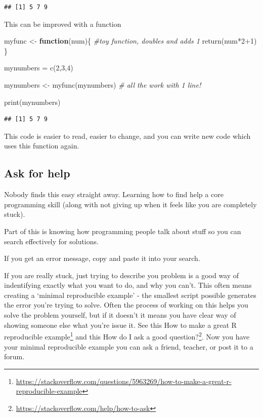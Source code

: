 \documentclass[
  12pt,
  a5paper,
]{book}
\newenvironment{Shaded}{\begin{snugshade}}{\end{snugshade}}
\newcommand{\CommentTok}[1]{\textcolor[rgb]{0.56,0.35,0.01}{\textit{#1}}}
\newcommand{\ControlFlowTok}[1]{\textcolor[rgb]{0.13,0.29,0.53}{\textbf{#1}}}
\newcommand{\DecValTok}[1]{\textcolor[rgb]{0.00,0.00,0.81}{#1}}
\newcommand{\FunctionTok}[1]{\textcolor[rgb]{0.00,0.00,0.00}{#1}}
\newcommand{\NormalTok}[1]{#1}
\newcommand{\OtherTok}[1]{\textcolor[rgb]{0.56,0.35,0.01}{#1}}
\newcommand{\SpecialCharTok}[1]{\textcolor[rgb]{0.00,0.00,0.00}{#1}}
\DeclareRobustCommand{\href}[2]{#2\footnote{\url{#1}}}
\begin{document}
\begin{verbatim}
## [1] 5 7 9
\end{verbatim}

This can be improved with a function

\begin{Shaded}
\begin{Highlighting}[]
\NormalTok{myfunc }\OtherTok{\textless{}{-}} \ControlFlowTok{function}\NormalTok{(num)\{}
  \CommentTok{\#toy function, doubles and adds 1}
  \FunctionTok{return}\NormalTok{(num}\SpecialCharTok{*}\DecValTok{2}\SpecialCharTok{+}\DecValTok{1}\NormalTok{)}
\NormalTok{  \}  }

\NormalTok{mynumbers }\OtherTok{=} \FunctionTok{c}\NormalTok{(}\DecValTok{2}\NormalTok{,}\DecValTok{3}\NormalTok{,}\DecValTok{4}\NormalTok{)}

\NormalTok{mynumbers }\OtherTok{\textless{}{-}} \FunctionTok{myfunc}\NormalTok{(mynumbers) }\CommentTok{\# all the work with 1 line!}

\FunctionTok{print}\NormalTok{(mynumbers)}
\end{Highlighting}
\end{Shaded}

\begin{verbatim}
## [1] 5 7 9
\end{verbatim}

This code is easier to read, easier to change, and you can write new code which uses this function again.

\hypertarget{ask-for-help}{%
\subsection{Ask for help}\label{ask-for-help}}

Nobody finds this easy straight away. Learning how to find help a core programming skill (along with not giving up when it feels like you are completely stuck).

Part of this is knowing how programming people talk about stuff so you can search effectively for solutions.

If you get an error message, copy and paste it into your search.

If you are really stuck, just trying to describe you problem is a good way of indentifying exactly what you want to do, and why you can't. This often means creating a `minimal reproducible example' - the smallest script possible generates the error you're trying to solve. Often the process of working on this helps you solve the problem yourself, but if it doesn't it means you have clear way of showing someone else what you're issue it. See this \href{https://stackoverflow.com/questions/5963269/how-to-make-a-great-r-reproducible-example}{How to make a great R reproducible example} and this \href{https://stackoverflow.com/help/how-to-ask}{How do I ask a good question?}. Now you have your minimal reproducible example you can ask a friend, teacher, or post it to a forum.
\end{document}
